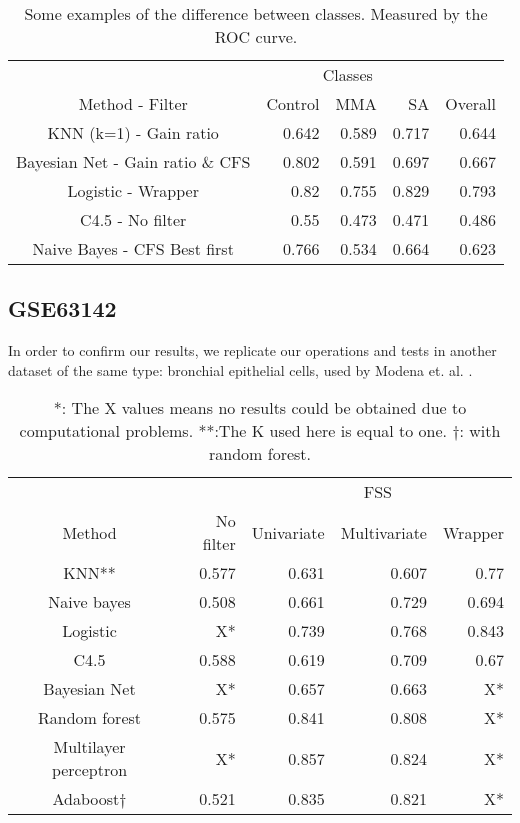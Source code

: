 \documentclass[conference,a4paper]{IEEEtran}
\begin{document}
\begin{table}[h]
	\caption{Some examples of the difference between classes. Measured by the ROC curve.}
	\centering
	\begin{tabular}{c r r r r}
		\hline\hline
		& \multicolumn{3}{c|}{Classes} & \\
		Method - Filter & Control & MMA & SA & \multicolumn{1}{|c}{Overall}\\ [0.2ex]
		\hline 
		KNN (k=1) - Gain ratio & 0.642 & 0.589 & 0.717 & 0.644 \\
		Bayesian Net - Gain ratio \& CFS & 0.802 & 0.591 & 0.697 & 0.667 \\
		Logistic - Wrapper & 0.82 & 0.755 & 0.829 & 0.793 \\
		C4.5 - No filter & 0.55 & 0.473 & 0.471 & 0.486\\
		Naive Bayes - CFS Best first & 0.766 & 0.534 & 0.664 & 0.623 \\ [1ex]
		\hline
	\end{tabular}
	\label{table:inClassResults}
\end{table}

\subsection{GSE63142}

In order to confirm our results, we replicate our operations and tests in another dataset of the same type: bronchial epithelial cells, used by Modena et. al. \cite{GSE63142}. 

\begin{table}[h]
	\caption{*: The X values means no results could be obtained due to computational problems. **:The K used here is equal to one. $\dagger$: with random forest.}
	\centering
	\begin{tabular}{c r r r r}
		\hline\hline
		& & \multicolumn{3}{|c}{FSS} \\
		Method & No filter & \multicolumn{1}{|c}{Univariate} & Multivariate & Wrapper\\ [0.2ex]
		\hline
		KNN** & 0.577 & 0.631 & 0.607 & 0.77 \\
		Naive bayes & 0.508 & 0.661 & 0.729 & 0.694 \\
		Logistic &  X* & 0.739 & 0.768 & 0.843\\
		C4.5 & 0.588 & 0.619 & 0.709 & 0.67\\
		Bayesian Net & X* & 0.657 & 0.663 & X* \\
		Random forest & 0.575 & 0.841 & 0.808 & X*\\
		Multilayer perceptron & X* & 0.857 & 0.824 & X*\\
		Adaboost$\dagger$ & 0.521 & 0.835 & 0.821 & X*\\ [1ex]
		\hline
	\end{tabular}
	\label{table:basicsResults63142}
\end{table}
\end{document}
